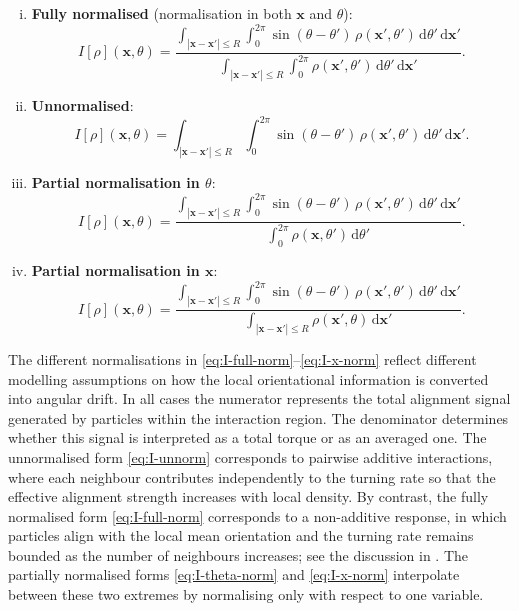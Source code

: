 \documentclass[a4paper,11pt]{article}
\theoremstyle{plain}
\theoremstyle{definition}
\theoremstyle{remark}
\newcommand{\dd}{\,\mathrm{d}}
\newcommand{\bx}{\mathbf{x}}
\begin{document}
\begin{enumerate}[(i)]
    \item \textbf{Fully normalised} (normalisation in both $\bx$ and $\theta$):
    \begin{equation}\label{eq:I-full-norm}
        I[\rho](\bx,\theta) = \frac{\displaystyle\int_{|\bx-\bx'| \leq R} \int_0^{2\pi} \sin(\theta-\theta')\,\rho(\bx',\theta')\dd\theta'\dd\bx'}{\displaystyle\int_{|\bx-\bx'| \leq R} \int_0^{2\pi} \rho(\bx',\theta')\dd\theta'\dd\bx'}.
    \end{equation}

    \item \textbf{Unnormalised}:
    \begin{equation}\label{eq:I-unnorm}
        I[\rho](\bx,\theta) = \int_{|\bx-\bx'| \leq R} \int_0^{2\pi} \sin(\theta-\theta')\,\rho(\bx',\theta')\dd\theta'\dd\bx'.
    \end{equation}

    \item \textbf{Partial normalisation in $\theta$}:
    \begin{equation}\label{eq:I-theta-norm}
        I[\rho](\bx,\theta) = \frac{\displaystyle\int_{|\bx-\bx'| \leq R} \int_0^{2\pi} \sin(\theta-\theta')\,\rho(\bx',\theta')\dd\theta'\dd\bx'}{\displaystyle\int_0^{2\pi} \rho(\bx,\theta')\dd\theta'}.
    \end{equation}

    \item \textbf{Partial normalisation in $\bx$}:
    \begin{equation}\label{eq:I-x-norm}
        I[\rho](\bx,\theta) = \frac{\displaystyle\int_{|\bx-\bx'| \leq R} \int_0^{2\pi} \sin(\theta-\theta')\,\rho(\bx',\theta')\dd\theta'\dd\bx'}{\displaystyle\int_{|\bx-\bx'| \leq R} \rho(\bx',\theta)\dd\bx'}.
    \end{equation}
\end{enumerate}
The different normalisations in \eqref{eq:I-full-norm}–\eqref{eq:I-x-norm} reflect different modelling assumptions on how the local orientational information is converted into angular drift. In all cases the numerator represents the total alignment signal generated by particles within the interaction region. The denominator determines whether this signal is interpreted as a total torque or as an averaged one. The unnormalised form \eqref{eq:I-unnorm} corresponds to pairwise additive interactions, where each neighbour contributes independently to the turning rate so that the effective alignment strength increases with local density. By contrast, the fully normalised form \eqref{eq:I-full-norm} corresponds to a non-additive response, in which particles align with the local mean orientation and the turning rate remains bounded as the number of neighbours increases; see the discussion in \cite{chepizhko2021revisiting}. The partially normalised forms \eqref{eq:I-theta-norm} and \eqref{eq:I-x-norm} interpolate between these two extremes by normalising only with respect to one variable.
\end{document}
